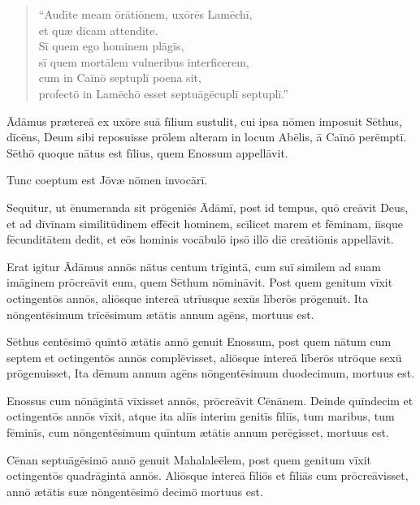\begin{verse}
\begin{patverse*}
``Audīte meam ōrātiōnem, uxōrēs Lamēchī,\\
et quæ dīcam attendite.\\
Sī quem ego hominem plāgīs,\\
sī quem mortālem vulneribus interficerem,\\
\Versus cum in Caīnō septuplī poena sit,\\ profectō in Lamēchō esset septuāgēcuplī septuplī.''
\end{patverse*}
\end{verse}

\Versus Ādāmus prætereā ex uxōre suā fīlium sustulit, cui ipsa nōmen imposuit Sēthus, dīcēns, Deum sibi reposuisse prōlem alteram in locum Abēlis, ā Caīnō perēmptī.
\Versus Sēthō quoque nātus est fīlius, quem Enossum appellāvit.

Tunc coeptum est Jōvæ nōmen invocārī.



\Caput
\Versus Sequitur, ut ēnumeranda sit prōgeniēs Ādāmī, post id tempus, quō creāvit Deus, et ad dīvīnam similitūdinem effēcit hominem,
\Versus scīlicet marem et fēminam, iīsque fēcunditātem dedit, et eōs hominis vocābulō ipsō illō diē creātiōnis appellāvit.

\Versus Erat igitur Ādāmus annōs nātus centum trīgintā, cum suī similem ad suam imāginem prōcreāvit eum, quem Sēthum nōmināvit.
\Versus Post quem genitum vīxit octingentōs annōs, aliōsque intereā utrīusque sexūs līberōs prōgenuit.
\Versus Ita nōngentēsimum trīcēsimum ætātis annum agēns, mortuus est.

\Versus Sēthus centēsimō quīntō ætātis annō genuit Enossum,
\Versus post quem nātum cum septem et octingentōs annōs complēvisset, aliōsque intereā līberōs utrōque sexū prōgenuisset,
\Versus Ita dēmum annum agēns nōngentēsimum duodecimum, mortuus est.

\Versus Enossus cum nōnāgintā vīxisset annōs, prōcreāvit Cēnānem.
\Versus Deinde quīndecim et octingentōs annōs vīxit, atque ita aliīs interim genitīs fīliīs, tum maribus, tum fēminīs,
\Versus cum nōngentēsimum quīntum ætātis annum perēgisset, mortuus est.

\Versus Cēnan septuāgēsimō annō genuit Mahalaleēlem,
\Versus post quem genitum vīxit octingentōs quadrāgintā annōs. Aliōsque intereā fīliōs et fīliās cum prōcreāvisset,
\Versus annō ætātis suæ nōngentēsimō decimō mortuus est.

